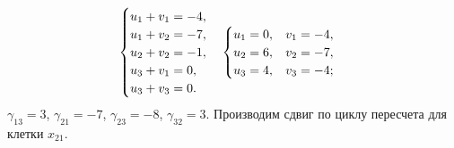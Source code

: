 $$
\begin{cases}
   u_1 + v_1 = -4,\\
   u_1 + v_2 = -7,\\
   u_2 + v_2 = -1,\\
   u_3 + v_1 = 0,\\
   u_3 + v_3 = 0.
\end{cases}
	\begin{cases}
		u_1 = 0,\hspace{2ex} v_1 = -4,\\
		u_2 = 6,\hspace{2ex} v_2 = -7,\\
		u_3 = 4,\hspace{2ex} v_3 = -4;
	\end{cases}
$$
$\gamma_{13}=3$, $\gamma_{21}=-7$, $\gamma_{23}=-8$, $\gamma_{32}=3$. Производим сдвиг по циклу пересчета для клетки $x_{21}$.
